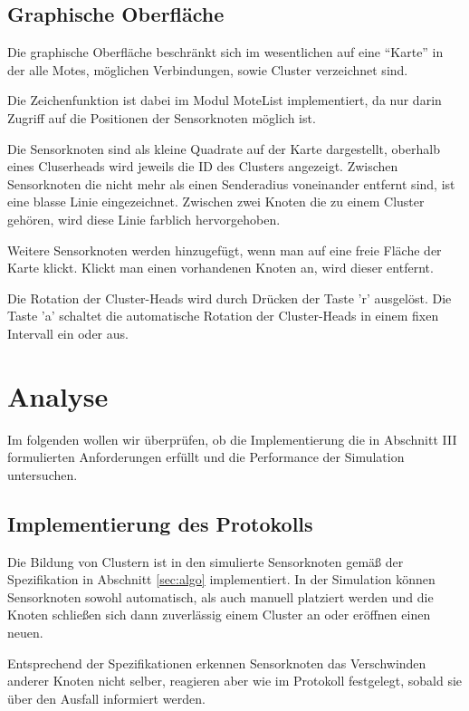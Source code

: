 \subsection{Graphische Oberfläche}

Die graphische Oberfläche beschränkt sich im wesentlichen auf eine
``Karte'' in der alle Motes, möglichen Verbindungen, sowie Cluster
verzeichnet sind.

Die Zeichenfunktion ist dabei im Modul MoteList implementiert, da nur
darin Zugriff auf die Positionen der Sensorknoten möglich ist.

Die Sensorknoten sind als kleine Quadrate auf der Karte dargestellt,
oberhalb eines Cluserheads wird jeweils die ID des Clusters angezeigt.
Zwischen Sensorknoten die nicht mehr als einen Senderadius voneinander
entfernt sind, ist eine blasse Linie eingezeichnet. Zwischen zwei Knoten
die zu einem Cluster gehören, wird diese Linie farblich hervorgehoben.

Weitere Sensorknoten werden hinzugefügt, wenn man auf eine freie Fläche
der Karte klickt. Klickt man einen vorhandenen Knoten an, wird dieser
entfernt.

Die Rotation der Cluster-Heads wird durch Drücken der Taste 'r'
ausgelöst. Die Taste 'a' schaltet die automatische Rotation der
Cluster-Heads in einem fixen Intervall ein oder aus.

\section{Analyse} \label{sec:ana}

Im folgenden wollen wir überprüfen, ob die Implementierung die in
Abschnitt III formulierten Anforderungen erfüllt und die Performance der
Simulation untersuchen.

\subsection{Implementierung des Protokolls}

Die Bildung von Clustern ist in den simulierte Sensorknoten gemäß der
Spezifikation in Abschnitt \ref{sec:algo} implementiert. In der Simulation können
Sensorknoten sowohl automatisch, als auch manuell platziert werden und
die Knoten schließen sich dann zuverlässig einem Cluster an oder eröffnen
einen neuen.

Entsprechend der Spezifikationen erkennen Sensorknoten das Verschwinden
anderer Knoten nicht selber, reagieren aber wie im Protokoll festgelegt,
sobald sie über den Ausfall informiert werden.

